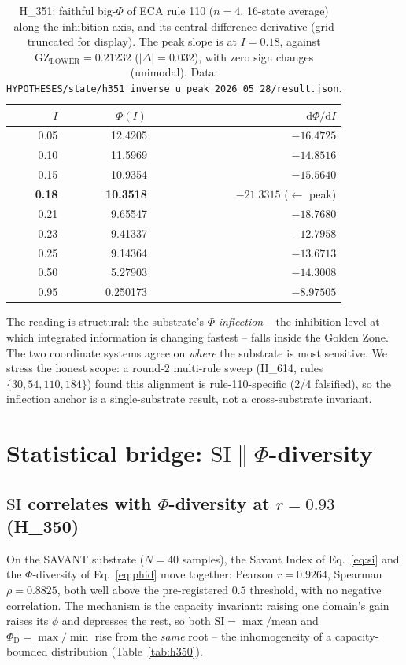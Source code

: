 \documentclass[11pt,a4paper]{article}
\newcommand{\GZL}{\mathrm{GZ_{LOWER}}}
\newcommand{\Svi}{\mathrm{SI}}
\newcommand{\PhiD}{\Phi_{\mathrm{D}}}
\begin{document}
\begin{table}[h]
\centering
\small
\begin{tabular}{rrr}
\toprule
\textbf{$I$} & \textbf{$\Phi(I)$} & \textbf{$\mathrm{d}\Phi/\mathrm{d}I$} \\
\midrule
0.05 & 12.4205 & $-16.4725$ \\
0.10 & 11.5969 & $-14.8516$ \\
0.15 & 10.9354 & $-15.5640$ \\
\textbf{0.18} & \textbf{10.3518} & $\mathbf{-21.3315}$ \;($\leftarrow$ peak) \\
0.21 & 9.65547 & $-18.7680$ \\
0.23 & 9.41337 & $-12.7958$ \\
0.25 & 9.14364 & $-13.6713$ \\
0.50 & 5.27903 & $-14.3008$ \\
0.95 & 0.250173 & $-8.97505$ \\
\bottomrule
\end{tabular}
\caption{H\_351: faithful big-$\Phi$ of ECA rule 110 ($n=4$, 16-state
average) along the inhibition axis, and its central-difference derivative
(grid truncated for display). The peak slope is at $I=0.18$, against
$\GZL=0.21232$ ($|\Delta|=0.032$), with zero sign changes (unimodal). Data:
\texttt{HYPOTHESES/state/h351\_inverse\_u\_peak\_2026\_05\_28/result.json}.}
\label{tab:h351}
\end{table}

The reading is structural: the substrate's $\Phi$ \emph{inflection} -- the
inhibition level at which integrated information is changing fastest --
falls inside the Golden Zone. The two coordinate systems agree on
\emph{where} the substrate is most sensitive. We stress the honest scope:
a round-2 multi-rule sweep (H\_614, rules $\{30,54,110,184\}$) found this
alignment is rule-110-specific (2/4 falsified), so the inflection anchor
is a single-substrate result, not a cross-substrate invariant.

\section{Statistical bridge: $\Svi \parallel \Phi$-diversity}
\label{sec:bridge}

\subsection{$\Svi$ correlates with $\Phi$-diversity at $r=0.93$ (H\_350)}
On the SAVANT substrate ($N=40$ samples), the Savant Index of
Eq.~\eqref{eq:si} and the $\Phi$-diversity of Eq.~\eqref{eq:phid} move
together: Pearson $r=0.9264$, Spearman $\rho=0.8825$, both well above the
pre-registered $0.5$ threshold, with no negative correlation. The
mechanism is the capacity invariant: raising one domain's gain raises its
$\phi$ and depresses the rest, so both $\Svi=\max/\mathrm{mean}$ and
$\PhiD=\max/\min$ rise from the \emph{same} root -- the inhomogeneity of a
capacity-bounded distribution (Table~\ref{tab:h350}).
\end{document}
